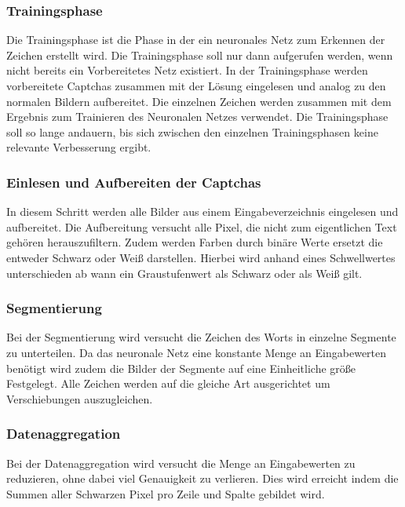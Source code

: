 \subsubsection{Trainingsphase}

Die Trainingsphase ist die Phase in der ein neuronales Netz zum Erkennen der
Zeichen erstellt wird. Die Trainingsphase soll nur dann aufgerufen werden, wenn
nicht bereits ein Vorbereitetes Netz existiert. In der Trainingsphase werden
vorbereitete Captchas zusammen mit der Lösung eingelesen und analog zu den
normalen Bildern aufbereitet. Die einzelnen Zeichen werden zusammen mit dem
Ergebnis zum Trainieren des Neuronalen Netzes verwendet. Die Trainingsphase
soll so lange andauern, bis sich zwischen den einzelnen Trainingsphasen keine
relevante Verbesserung ergibt.


\subsubsection{Einlesen und Aufbereiten der Captchas}

In diesem Schritt werden alle Bilder aus einem Eingabeverzeichnis eingelesen und
aufbereitet. Die Aufbereitung versucht alle Pixel, die nicht zum eigentlichen
Text gehören herauszufiltern. Zudem werden Farben durch binäre Werte ersetzt
die entweder Schwarz oder Weiß darstellen. Hierbei wird anhand eines
Schwellwertes unterschieden ab wann ein Graustufenwert als Schwarz oder als
Weiß gilt.


\subsubsection{Segmentierung}

Bei der Segmentierung wird versucht die Zeichen des Worts in einzelne Segmente
zu unterteilen. Da das neuronale Netz eine konstante Menge an Eingabewerten
benötigt wird zudem die Bilder der Segmente auf eine Einheitliche größe
Festgelegt. Alle Zeichen werden auf die gleiche Art ausgerichtet um
Verschiebungen auszugleichen.


\subsubsection{Datenaggregation}

Bei der Datenaggregation wird versucht die Menge an Eingabewerten zu reduzieren,
ohne dabei viel Genauigkeit zu verlieren. Dies wird erreicht indem 
die Summen aller Schwarzen Pixel pro Zeile und Spalte gebildet wird. 

